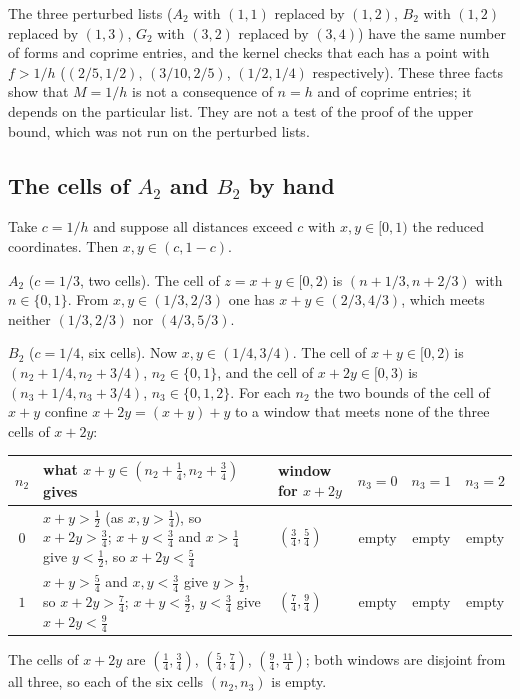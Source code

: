 \documentclass[11pt]{amsart}
\theoremstyle{definition}
\theoremstyle{remark}
\begin{document}
The three perturbed lists ($A_2$ with $(1,1)$ replaced by $(1,2)$, $B_2$ with $(1,2)$ replaced by $(1,3)$, $G_2$ with $(3,2)$ replaced by $(3,4)$) have the same number of forms and coprime entries, and the kernel checks that each has a point with $f>1/h$ ($(2/5,1/2)$, $(3/10,2/5)$, $(1/2,1/4)$ respectively). These three facts show that $M=1/h$ is not a consequence of $n=h$ and of coprime entries; it depends on the particular list. They are not a test of the proof of the upper bound, which was not run on the perturbed lists.

\subsection{The cells of $A_2$ and $B_2$ by hand}
Take $c=1/h$ and suppose all distances exceed $c$ with $x,y\in[0,1)$ the reduced coordinates. Then $x,y\in(c,1-c)$.

\emph{$A_2$} ($c=1/3$, two cells). The cell of $z=x+y\in[0,2)$ is $(n+1/3,n+2/3)$ with $n\in\{0,1\}$. From $x,y\in(1/3,2/3)$ one has $x+y\in(2/3,4/3)$, which meets neither $(1/3,2/3)$ nor $(4/3,5/3)$.

\emph{$B_2$} ($c=1/4$, six cells). Now $x,y\in(1/4,3/4)$. The cell of $x+y\in[0,2)$ is $(n_2+1/4,n_2+3/4)$, $n_2\in\{0,1\}$, and the cell of $x+2y\in[0,3)$ is $(n_3+1/4,n_3+3/4)$, $n_3\in\{0,1,2\}$. For each $n_2$ the two bounds of the cell of $x+y$ confine $x+2y=(x+y)+y$ to a window that meets none of the three cells of $x+2y$:
\begin{center}
\small
\begin{tabular}{@{}cL{4.6cm}L{3.1cm}ccc@{}}
\toprule
$n_2$ & what $x+y\in(n_2+\tfrac14,n_2+\tfrac34)$ gives & window for $x+2y$ & $n_3=0$ & $n_3=1$ & $n_3=2$\\
\midrule
$0$ & $x+y>\tfrac12$ (as $x,y>\tfrac14$), so $x+2y>\tfrac34$; $x+y<\tfrac34$ and $x>\tfrac14$ give $y<\tfrac12$, so $x+2y<\tfrac54$ & $(\tfrac34,\tfrac54)$ & empty & empty & empty\\
$1$ & $x+y>\tfrac54$ and $x,y<\tfrac34$ give $y>\tfrac12$, so $x+2y>\tfrac74$; $x+y<\tfrac32$, $y<\tfrac34$ give $x+2y<\tfrac94$ & $(\tfrac74,\tfrac94)$ & empty & empty & empty\\
\bottomrule
\end{tabular}
\end{center}
The cells of $x+2y$ are $(\tfrac14,\tfrac34)$, $(\tfrac54,\tfrac74)$, $(\tfrac94,\tfrac{11}4)$; both windows are disjoint from all three, so each of the six cells $(n_2,n_3)$ is empty.
\end{document}
